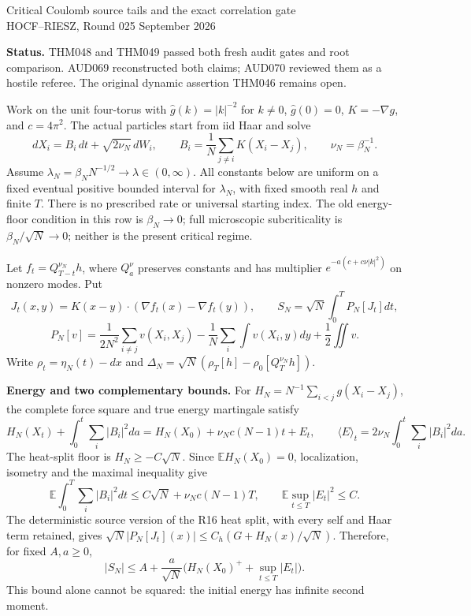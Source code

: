 \documentclass[11pt]{article}
\newcommand{\E}{\mathbb E}
\begin{document}
\begin{center}
{\large Critical Coulomb source tails and the exact correlation gate}\\[4pt]
HOCF--RIESZ, Round 025  September 2026
\end{center}
\noindent\textbf{Status.} THM048 and THM049 passed both fresh audit gates and root comparison. AUD069 reconstructed both claims; AUD070 reviewed them as a hostile referee. The original dynamic assertion THM046 remains open.

Work on the unit four-torus with $\widehat g(k)=|k|^{-2}$ for $k\ne0$, $\widehat g(0)=0$, $K=-\nabla g$, and $c=4\pi^2$. The actual particles start from iid Haar and solve
\[
 dX_i=B_i\,dt+\sqrt{2\nu_N}\,dW_i,\qquad
 B_i=\frac1N\sum_{j\ne i}K(X_i-X_j),\qquad
 \nu_N=\beta_N^{-1}.
\]
Assume $\lambda_N=\beta_NN^{-1/2}\to\lambda\in(0,\infty)$. All constants below are uniform on a fixed eventual positive bounded interval for $\lambda_N$, with fixed smooth real $h$ and finite $T$. There is no prescribed rate or universal starting index. The old energy-floor condition in this row is $\beta_N\to0$; full microscopic subcriticality is $\beta_N/\sqrt N\to0$; neither is the present critical regime.

Let $f_t=Q_{T-t}^{\nu_N}h$, where $Q_a^\nu$ preserves constants and has multiplier $e^{-a(c+c\nu|k|^2)}$ on nonzero modes. Put
\[
 J_t(x,y)=K(x-y)\cdot(\nabla f_t(x)-\nabla f_t(y)),\qquad
 S_N=\sqrt N\int_0^T P_N[J_t]dt,
\]
\[
 P_N[v]=\frac1{2N^2}\sum_{i\ne j}v(X_i,X_j)
       -\frac1N\sum_i\int v(X_i,y)dy+\frac12\iint v.
\]
Write $\rho_t=\eta_N(t)-dx$ and $\Delta_N=\sqrt N(\rho_T[h]-\rho_0[Q_T^{\nu_N}h])$.

\noindent\textbf{Energy and two complementary bounds.}
For $H_N=N^{-1}\sum_{i<j}g(X_i-X_j)$, the complete force square and true energy martingale satisfy
\[
 H_N(X_t)+\int_0^t\sum_i|B_i|^2da
 =H_N(X_0)+\nu_Nc(N-1)t+E_t,
\qquad
 \langle E\rangle_t=2\nu_N\int_0^t\sum_i|B_i|^2da.
\]
The heat-split floor is $H_N\ge-C\sqrt N$. Since $\E H_N(X_0)=0$, localization, isometry and the maximal inequality give
\[
 \E\int_0^T\sum_i|B_i|^2dt\le C\sqrt N+\nu_Nc(N-1)T,
 \qquad \E\sup_{t\le T}|E_t|^2\le C.
\]
The deterministic source version of the R16 heat split, with every self and Haar term retained, gives $\sqrt N|P_N[J_t](x)|\le C_h(G+H_N(x)/\sqrt N)$. Therefore, for fixed $A,a\ge0$,
\[
 |S_N|\le A+\frac a{\sqrt N}
     \bigl(H_N(X_0)^++\sup_{t\le T}|E_t|\bigr).
\]
This bound alone cannot be squared: the initial energy has infinite second moment.
\end{document}
